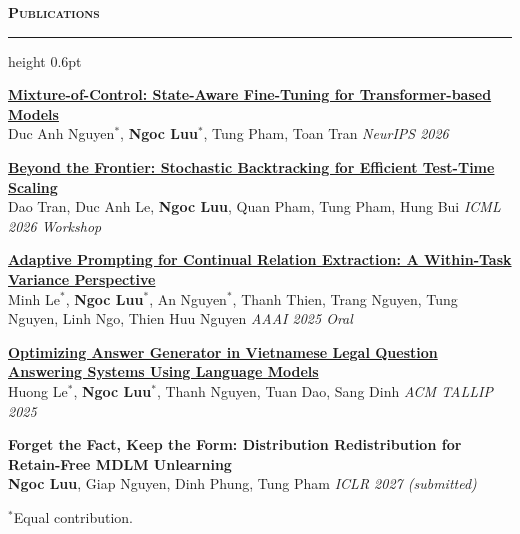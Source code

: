 \documentclass{resume}
\renewcommand{\small}{\fontsize{9.7}{11.8}\selectfont}
\renewenvironment{rSection}[1]{%
  \vspace{0.45em}%
  {\color{accent}\large\scshape\bfseries #1}\par\vspace{0.12em}%
  {\color{accent}\hrule height 0.6pt}\vspace{0.25em}%
  \begin{list}{}{%
    \setlength{\leftmargin}{0em}%
    \setlength{\topsep}{0.3em}%
    \setlength{\partopsep}{0pt}%
    \setlength{\parsep}{0pt}%
    \setlength{\itemsep}{0pt}%
  }%
  \item[]%
}{%
  \end{list}%
}
\newcommand{\publication}[3]{%
  \textbf{#1}\\
  {\small #3} \hfill {\small\itshape\color{accent}#2}\par\vspace{0.2em}%
}
\newcommand{\me}{\textbf{Ngoc Luu}}
\begin{document}

\begin{rSection}{Publications}

\publication
{\href{https://arxiv.org/abs/2606.31397}{Mixture-of-Control: State-Aware Fine-Tuning for Transformer-based Models}}
{NeurIPS 2026}
{Duc Anh Nguyen$^*$, \me$^*$, Tung Pham, Toan Tran}

\publication
{\href{https://arxiv.org/abs/2605.25143}{Beyond the Frontier: Stochastic Backtracking for Efficient Test-Time Scaling}}
{ICML 2026 Workshop}
{Dao Tran, Duc Anh Le, \me, Quan Pham, Tung Pham, Hung Bui}

\publication
{\href{https://ojs.aaai.org/index.php/AAAI/article/view/34616}{Adaptive Prompting for Continual Relation Extraction: A Within-Task Variance Perspective}}
{AAAI 2025 Oral}
{Minh Le$^*$, \me$^*$, An Nguyen$^*$, Thanh Thien, Trang Nguyen, Tung Nguyen, Linh Ngo, Thien Huu Nguyen}

\publication
{\href{https://doi.org/10.1145/3732938}{Optimizing Answer Generator in Vietnamese Legal Question Answering Systems Using Language Models}}
{ACM TALLIP 2025}
{Huong Le$^*$, \me$^*$, Thanh Nguyen, Tuan Dao, Sang Dinh}

\publication
{Forget the Fact, Keep the Form: Distribution Redistribution for Retain-Free MDLM Unlearning}
{ICLR 2027 (submitted)}
{\me, Giap Nguyen, Dinh Phung, Tung Pham}

{\footnotesize\color{muted}$^*$Equal contribution.}
\end{rSection}

\end{document}
